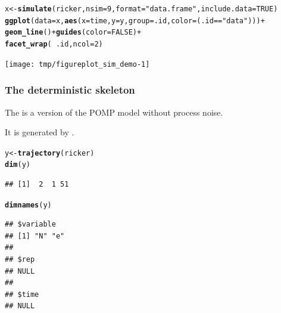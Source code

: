 \documentclass{beamer}\usepackage[]{graphicx}\usepackage[]{color}
\makeatletter
\newcommand{\hlnum}[1]{\textcolor[rgb]{0.686,0.059,0.569}{#1}}%
\newcommand{\hlstr}[1]{\textcolor[rgb]{0.192,0.494,0.8}{#1}}%
\newcommand{\hlopt}[1]{\textcolor[rgb]{0,0,0}{#1}}%
\newcommand{\hlstd}[1]{\textcolor[rgb]{0.345,0.345,0.345}{#1}}%
\newcommand{\hlkwb}[1]{\textcolor[rgb]{0.69,0.353,0.396}{#1}}%
\newcommand{\hlkwc}[1]{\textcolor[rgb]{0.333,0.667,0.333}{#1}}%
\newcommand{\hlkwd}[1]{\textcolor[rgb]{0.737,0.353,0.396}{\textbf{#1}}}%
\newenvironment{kframe}{%
 \def\at@end@of@kframe{}%
 \ifinner\ifhmode%
  \def\at@end@of@kframe{\end{minipage}}%
  \begin{minipage}{\columnwidth}%
 \fi\fi%
 \def\FrameCommand##1{\hskip\@totalleftmargin \hskip-\fboxsep
 \colorbox{shadecolor}{##1}\hskip-\fboxsep
     \hskip-\linewidth \hskip-\@totalleftmargin \hskip\columnwidth}%
 \MakeFramed {\advance\hsize-\width
   \@totalleftmargin\z@ \linewidth\hsize
   \@setminipage}}%
 {\par\unskip\endMakeFramed%
 \at@end@of@kframe}
\newenvironment{knitrout}{}{} %
\makeatother
\begin{document}
\begin{frame}[fragile]

\begin{knitrout}\small
{}\color{fgcolor}\begin{kframe}
\begin{alltt}
\hlstd{x} \hlkwb{<-} \hlkwd{simulate}\hlstd{(ricker,}\hlkwc{nsim}\hlstd{=}\hlnum{9}\hlstd{,}\hlkwc{format}\hlstd{=}\hlstr{"data.frame"}\hlstd{,}\hlkwc{include.data}\hlstd{=}\hlnum{TRUE}\hlstd{)}
\hlkwd{ggplot}\hlstd{(}\hlkwc{data}\hlstd{=x,}\hlkwd{aes}\hlstd{(}\hlkwc{x}\hlstd{=time,}\hlkwc{y}\hlstd{=y,}\hlkwc{group}\hlstd{=.id,}\hlkwc{color}\hlstd{=(.id}\hlopt{==}\hlstr{"data"}\hlstd{)))}\hlopt{+}
  \hlkwd{geom_line}\hlstd{()}\hlopt{+}\hlkwd{guides}\hlstd{(}\hlkwc{color}\hlstd{=}\hlnum{FALSE}\hlstd{)}\hlopt{+}
  \hlkwd{facet_wrap}\hlstd{(}\hlopt{~}\hlstd{.id,}\hlkwc{ncol}\hlstd{=}\hlnum{2}\hlstd{)}
\end{alltt}
\end{kframe}
\end{knitrout}

\begin{knitrout}\small
{}\color{fgcolor}

{\centering \texttt{[image: tmp/figureplot\_sim\_demo-1]} 

}



\end{knitrout}


\end{frame}

\begin{frame}[fragile]

\frametitle{The deterministic skeleton}
\bi
\item The  is a version of the POMP model without process noise.
\item It is generated by .
\ei
\begin{knitrout}\small
{}\color{fgcolor}\begin{kframe}
\begin{alltt}
\hlstd{y} \hlkwb{<-} \hlkwd{trajectory}\hlstd{(ricker)}
\hlkwd{dim}\hlstd{(y)}
\end{alltt}
\begin{verbatim}
## [1]  2  1 51
\end{verbatim}
\begin{alltt}
\hlkwd{dimnames}\hlstd{(y)}
\end{alltt}
\begin{verbatim}
## $variable
## [1] "N" "e"
## 
## $rep
## NULL
## 
## $time
## NULL
\end{verbatim}
\end{kframe}
\end{knitrout}

\end{frame}
\end{document}
